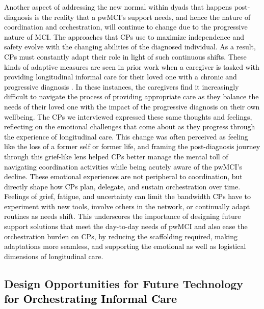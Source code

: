 \documentclass[acmsmall]{acmart}
\begin{document}
\textcolor{black}{Another aspect of addressing the new normal within dyads that happens post-diagnosis is the reality that a pwMCI’s support needs, and hence the nature of coordination and orchestration, will \textcolor{black}{continue to} change due to the progressive nature of MCI. The approaches that CPs use to maximize independence and safety evolve with the changing abilities of the diagnosed individual. As a result, CPs must constantly adapt their role in light of such continuous shifts. These kinds of adaptive measures are seen in prior work when a caregiver is tasked with providing longitudinal informal care for their loved one with a chronic and progressive diagnosis \cite{zarit1986subjective, grunfeld2004family}. In these instances, the caregivers find it increasingly difficult to navigate the process of providing appropriate care as they balance the needs of their loved one with the impact of the progressive diagnosis on their own wellbeing. The CPs we interviewed expressed these same thoughts and feelings, reflecting on the emotional challenges that come about as they progress through the experience of longitudinal care. \textcolor{black}{This change was often perceived as feeling like the loss of a former self or former life, and framing the post-diagnosis journey through this grief-like lens helped CPs} better manage the mental toll of navigating coordination activities while being acutely aware of the pwMCI’s decline. These emotional experiences are not peripheral to coordination, but directly shape how CPs plan, delegate, and sustain orchestration over time. Feelings of grief, fatigue, and uncertainty can limit the bandwidth CPs have to experiment with new tools, involve others in the network, or continually adapt routines as needs shift. This underscores the importance of designing future support solutions that meet the day-to-day needs of pwMCI and also ease the orchestration burden on CPs, by reducing the scaffolding required, making adaptations more seamless, and supporting the emotional as well as logistical dimensions of longitudinal care.}

\subsection{Design Opportunities for Future Technology \textcolor{black}{for Orchestrating Informal Care}}
\end{document}
